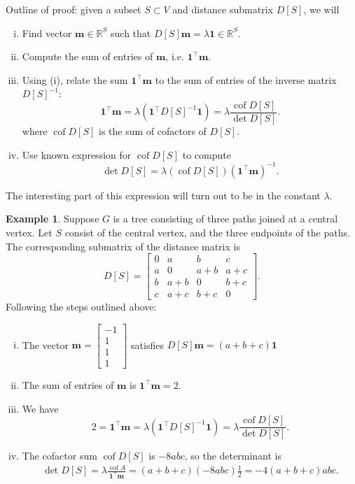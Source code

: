 \documentclass{amsart}
\theoremstyle{definition}
\newtheorem{eg}[thm]{Example}
\newcommand{\RR}{\mathbb{R}}
\newcommand{\bone}{\mathbf{1}}
\newcommand{\boldm}{\mathbf{m}}
\newcommand{\tr}{\intercal}
\DeclareMathOperator{\cof}{cof}
\begin{document}
Outline of proof: given a  subset $S \subset V$ and distance submatrix $D[S]$, we will
\begin{enumerate}[(i)]
\item 
Find vector $\boldm \in \RR^S$ such that $D[S]\boldm = \lambda \mathbf{1} \in \RR^S$.

\item 
Compute the sum of entries of $\boldm$, i.e. $\mathbf{1}^\tr \boldm$.

\item 
Using (i), relate the sum $\bone^\tr \boldm$ to the sum of entries of the inverse matrix $D[S]^{-1}$:
$$ \mathbf{1}^\tr \boldm 
= \lambda (\mathbf{1}^\tr D[S]^{-1} \mathbf{1}) 
= \lambda \frac{\cof D[S]}{\det D[S]} .$$
where $\cof D[S]$ is the sum of cofactors of $D[S]$.

\item 
Use known expression for $\cof D[S]$ to compute
$$
\det D[S] = \lambda (\cof D[S]) \left( \mathbf{1}^\tr \boldm \right)^{-1}.
$$
\end{enumerate}
The interesting part  of this expression will turn out to be in the constant $\lambda$.

\begin{eg}
Suppose $G$ is a tree consisting of three paths joined at a central vertex.
Let $S$ consist of the central vertex, and the three endpoints of the paths. 
The corresponding submatrix of the distance matrix is
$$
D[S] = \begin{bmatrix}
0 & a & b & c \\
a & 0 & a + b & a + c \\
b & a + b & 0 & b + c \\
c & a + c & b + c & 0
\end{bmatrix}.
$$
Following the steps outlined above:
\begin{enumerate}[(i)]
\item 
The vector $\boldm = \begin{bmatrix} -1 \\ 1 \\ 1 \\ 1 \end{bmatrix}$ satisfies
$
D[S] \boldm = (a+b+c) \mathbf{1}
$

\item 
The sum of entries of $\boldm$ is $\mathbf{1}^\tr \boldm = 2$.

\item 
We have 
$$2 = \mathbf{1}^\tr \boldm = \lambda (\mathbf{1}^\tr D[S]^{-1} \mathbf{1}) = \displaystyle \lambda \frac{\cof D[S]}{\det D[S]}.$$

\item 
The cofactor sum  
$\cof D[S]$ is $-8 abc$,
so the determinant is
\begin{align*}
\det D[S] 
= \lambda \frac{\cof A}{\mathbf{1}^\tr \boldm}
= (a+b+c) (-8 abc)\frac{1}{2}
= -4(a+b+c)abc.
\end{align*}
\end{enumerate}
\end{eg}
\end{document}
